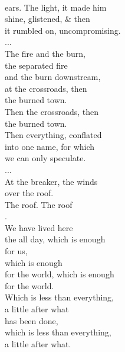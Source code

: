\documentclass[smalldemyvopaper,11pt,twoside,onecolumn,openright,extrafontsizes]{memoir}
\begin{document}
\\ears. The light, it made him
\\shine, glistened, \& then
\\it rumbled on, uncompromising.
\\...
\\The fire and the burn,
\\the separated fire
\\and the burn downstream,
\\at the crossroads, then
\\the burned town.
\\Then the crossroads, then
\\the burned town.
\\Then everything, conflated
\\into one name, for which
\\we can only speculate.
\\...
\\At the breaker, the winds
\\over the roof.
\\The roof. The roof
\\.
\\We have lived here
\\the all day, which is enough
\\for us,
\\which is enough
\\for the world, which is enough
\\for the world.
\\Which is less than everything,
\\a little after what
\\has been done,
\\which is less than everything,
\\a little after what.
\end{document}
